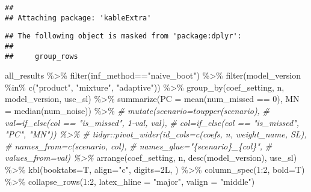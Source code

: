 \documentclass[
]{article}
\newenvironment{Shaded}{\begin{snugshade}}{\end{snugshade}}
\newcommand{\AttributeTok}[1]{\textcolor[rgb]{0.77,0.63,0.00}{#1}}
\newcommand{\CommentTok}[1]{\textcolor[rgb]{0.56,0.35,0.01}{\textit{#1}}}
\newcommand{\DecValTok}[1]{\textcolor[rgb]{0.00,0.00,0.81}{#1}}
\newcommand{\FunctionTok}[1]{\textcolor[rgb]{0.00,0.00,0.00}{#1}}
\newcommand{\NormalTok}[1]{#1}
\newcommand{\SpecialCharTok}[1]{\textcolor[rgb]{0.00,0.00,0.00}{#1}}
\newcommand{\StringTok}[1]{\textcolor[rgb]{0.31,0.60,0.02}{#1}}
\begin{document}
\begin{verbatim}
## 
## Attaching package: 'kableExtra'
\end{verbatim}

\begin{verbatim}
## The following object is masked from 'package:dplyr':
## 
##     group_rows
\end{verbatim}

\begin{Shaded}
\begin{Highlighting}[]
\NormalTok{all\_results }\SpecialCharTok{\%\textgreater{}\%} \FunctionTok{filter}\NormalTok{(inf\_method}\SpecialCharTok{==}\StringTok{"naive\_boot"}\NormalTok{) }\SpecialCharTok{\%\textgreater{}\%} 
  \FunctionTok{filter}\NormalTok{(model\_version }\SpecialCharTok{\%in\%} \FunctionTok{c}\NormalTok{(}\StringTok{"product"}\NormalTok{, }\StringTok{"mixture"}\NormalTok{, }\StringTok{"adaptive"}\NormalTok{)) }\SpecialCharTok{\%\textgreater{}\%} 
  \FunctionTok{group\_by}\NormalTok{(coef\_setting, n, model\_version, use\_sl) }\SpecialCharTok{\%\textgreater{}\%} 
  \FunctionTok{summarize}\NormalTok{(}\AttributeTok{PC =} \FunctionTok{mean}\NormalTok{(num\_missed }\SpecialCharTok{==} \DecValTok{0}\NormalTok{), }
            \AttributeTok{MN =} \FunctionTok{median}\NormalTok{(num\_noise)) }\SpecialCharTok{\%\textgreater{}\%} 
  \CommentTok{\# mutate(scenario=toupper(scenario),}
  \CommentTok{\#        val=if\_else(col == "is\_missed", 1{-}val, val),}
  \CommentTok{\#        col=if\_else(col == "is\_missed", "PC", "MN")) \%\textgreater{}\% }
  \CommentTok{\# tidyr::pivot\_wider(id\_cols=c(coefs, n, weight\_name, SL), }
  \CommentTok{\#                    names\_from=c(scenario, col),}
  \CommentTok{\#                    names\_glue="\{scenario\}\_\{col\}",}
  \CommentTok{\#                    values\_from=val) \%\textgreater{}\% }
  \FunctionTok{arrange}\NormalTok{(coef\_setting, n, }\FunctionTok{desc}\NormalTok{(model\_version), use\_sl) }\SpecialCharTok{\%\textgreater{}\%} 
  \FunctionTok{kbl}\NormalTok{(}\AttributeTok{booktabs=}\NormalTok{T, }\AttributeTok{align=}\StringTok{"c"}\NormalTok{, }\AttributeTok{digits=}\NormalTok{2L, ) }\SpecialCharTok{\%\textgreater{}\%} 
  \FunctionTok{column\_spec}\NormalTok{(}\DecValTok{1}\SpecialCharTok{:}\DecValTok{2}\NormalTok{, }\AttributeTok{bold=}\NormalTok{T) }\SpecialCharTok{\%\textgreater{}\%} 
  \FunctionTok{collapse\_rows}\NormalTok{(}\DecValTok{1}\SpecialCharTok{:}\DecValTok{2}\NormalTok{, }\AttributeTok{latex\_hline =} \StringTok{"major"}\NormalTok{, }\AttributeTok{valign =} \StringTok{"middle"}\NormalTok{)}
\end{Highlighting}
\end{Shaded}
\end{document}
